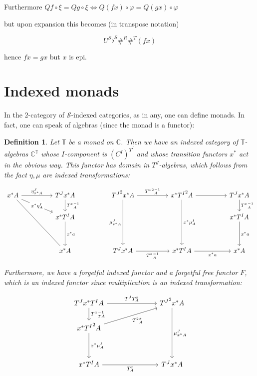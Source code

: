 \documentclass[10pt, oneside]{article}
\newtheorem{definition}[theorem]{Definition}
\begin{document}
Furthermore $Q f \circ \xi = Q g \circ \xi \iff Q (f x) \circ \varphi = Q (g x) \circ \varphi$

\noindent but upon expansion this becomes (in transpose notation)

$$U^S \flat^S \#^R \#^T (fx)$$

\noindent hence $fx = gx$ but $x$ is epi.



\section{Indexed monads}

In the $2$-category of $\mathcal{S}$-indexed categories, as in any, one can define monads. In fact, one can speak of algebras (since the monad is a functor):

\begin{definition}
	Let $\mathbb{T}$ be a monad on $\mathbb{C}$. Then we have an indexed category of $\mathbb{T}$-algebras $\mathbb{C}^\mathbb{T}$ whose $I$-component is $(C^I)^{T^I}$ and whose transition functors $x^\ast$ act in the obvious way. This functor has domain in $T^J$-algebras, which follows from the fact $\eta, \mu$ are indexed transformations:
	
	\[\begin{tikzcd}
		{x^\ast A} && {T^J x^\ast A} && {{T^J}^2 x^\ast A} && {x^\ast {T^I}^2 A} && {T^J x^\ast A} \\
		&& {x^\ast T^I A} &&&&&& {x^\ast T^I A} \\
		\\
		&& {x^\ast A} && {T^J x^\ast A} && {x^\ast T^I A} && {x^\ast A}
		\arrow["{x^\ast a}", from=2-3, to=4-3]
		\arrow["{{T^x}^{-1}_A}", from=1-3, to=2-3]
		\arrow["{\eta^J_{x^\ast A}}", from=1-1, to=1-3]
		\arrow["{x^\ast \eta^I_A}"{description}, from=1-1, to=2-3]
		\arrow[no head, from=1-1, to=4-3]
		\arrow["{\mu^J_{x^\ast A}}"', from=1-5, to=4-5]
		\arrow["{x^\ast a}", from=2-9, to=4-9]
		\arrow["{{T^x}^{-1}_A}", from=1-9, to=2-9]
		\arrow["{{T^x}^{-1}_A}"', from=4-5, to=4-7]
		\arrow["{x^\ast a}"', from=4-7, to=4-9]
		\arrow["{{{T^x}^2}^{-1}_A}", from=1-5, to=1-7]
		\arrow["{x^\ast \mu^I_A}", from=1-7, to=4-7]
		\arrow[from=1-7, to=1-9]
	\end{tikzcd}\]
	
	Furthermore, we have a forgetful indexed functor and a forgetful free functor $F$, which is an indexed functor since multiplication is an indexed transformation:
	
	\[\begin{tikzcd}
		{T^J x^\ast T^I A} &&& {{T^J}^2 x^\ast A} \\
		{x^\ast {T^I}^2 A} \\
		\\
		{x^\ast T^I A} &&& {T^J x^\ast A}
		\arrow["{x^\ast \mu^I_A}", from=2-1, to=4-1]
		\arrow["{{T^x}^{-1}_{TA}}", from=1-1, to=2-1]
		\arrow["{T^x_A}"', from=4-1, to=4-4]
		\arrow["{\mu^J_{x^\ast A}}", from=1-4, to=4-4]
		\arrow["{T^J T^x_A}", from=1-1, to=1-4]
		\arrow["{{T^2}^x_A}"', from=2-1, to=1-4]
	\end{tikzcd}\]
	

\end{definition}
\end{document}
